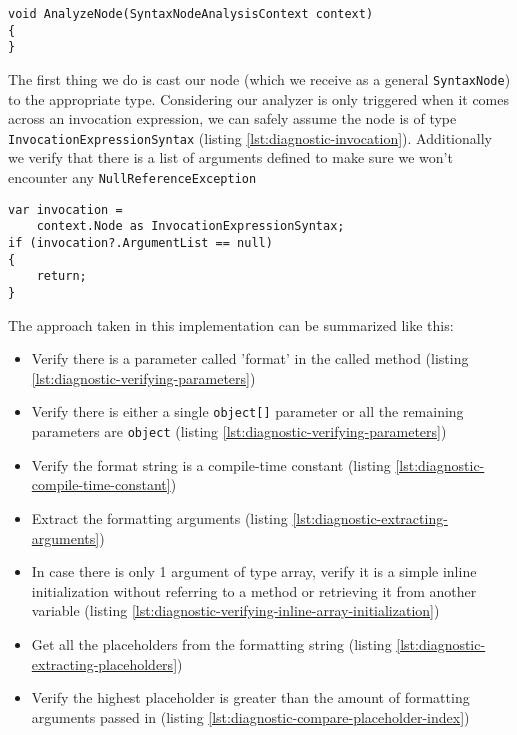 \begin{lstlisting}[label={lst:diagnostic-analyzenode}]
void AnalyzeNode(SyntaxNodeAnalysisContext context)
{
}
\end{lstlisting}

The first thing we do is cast our node (which we receive as a general \texttt{SyntaxNode}) to the appropriate type. Considering our analyzer is only triggered when it comes across an invocation expression, we can safely assume the node is of type \texttt{InvocationExpressionSyntax} (listing \ref{lst:diagnostic-invocation}). Additionally we verify that there is a list of arguments defined to make sure we won't encounter any \texttt{NullReferenceException}

\begin{lstlisting}[label={lst:diagnostic-invocation}]
var invocation = 
	context.Node as InvocationExpressionSyntax;
if (invocation?.ArgumentList == null)
{
	return;
}
\end{lstlisting}

The approach taken in this implementation can be summarized like this:

\begin{itemize}
\item Verify there is a parameter called 'format' in the called method (listing \ref{lst:diagnostic-verifying-parameters})
\item Verify there is either a single \texttt{object[]} parameter or all the remaining parameters are \texttt{object} (listing \ref{lst:diagnostic-verifying-parameters})
\item Verify the format string is a compile-time constant (listing \ref{lst:diagnostic-compile-time-constant})
\item Extract the formatting arguments (listing \ref{lst:diagnostic-extracting-arguments})
\item In case there is only 1 argument of type array, verify it is a simple inline initialization without referring to a method or retrieving it from another variable (listing \ref{lst:diagnostic-verifying-inline-array-initialization})
\item Get all the placeholders from the formatting string (listing \ref{lst:diagnostic-extracting-placeholders})
\item Verify the highest placeholder is greater than the amount of formatting arguments passed in (listing \ref{lst:diagnostic-compare-placeholder-index})
\end{itemize}

